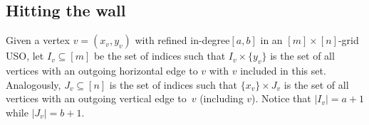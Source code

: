 \documentclass[a4paper,10pt]{article}
\newcommand{\indegree}{refined in-degree\xspace}
\begin{document}
% 
% 


\subsection{Hitting the wall}

Given a vertex $v = (x_v, y_v)$ with \indegree $[a, b]$ in an  $[m]\times [n]$-grid USO, let $I_v\subseteq [m]$ be the set of indices such that  $I_v \times \{y_v\}$ is the set of all vertices with an outgoing horizontal edge to $v$ with $v$ included in this set. Analogously, $J_v\subseteq [n]$ is the set of indices such that $\{x_v\}\times J_v$ is the set of all vertices with an outgoing vertical edge to~$v$ (including $v$). Notice that $|I_v| = a + 1$ while $|J_v| = b + 1$.
\end{document}
